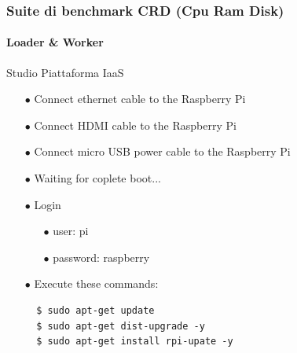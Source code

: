 \documentclass{beamer}
\begin{document}
\begin{frame}[fragile]
	\frametitle{\textbf{Suite di benchmark CRD (Cpu Ram Disk)}}
	\framesubtitle{\textbf{Loader \& Worker}}

	\begin{block}{Studio Piattaforma IaaS}
		\begin{itemize}
			\item[$\bullet$] Connect ethernet cable to the Raspberry Pi
			\item[$\bullet$] Connect HDMI cable to the Raspberry Pi
			\item[$\bullet$] Connect micro USB power cable to the Raspberry Pi
			\item[$\bullet$] Waiting for coplete boot...
			\item[$\bullet$] Login
			\begin{itemize}
				\item[$\bullet$] user: pi
				\item[$\bullet$] password: raspberry
			\end{itemize}
			\item[$\bullet$] Execute these commands:
			\begin{lstlisting}
  $ sudo apt-get update
  $ sudo apt-get dist-upgrade -y
  $ sudo apt-get install rpi-upate -y
			\end{lstlisting}
		\end{itemize}
	\end{block}
\end{frame}

\end{document}
